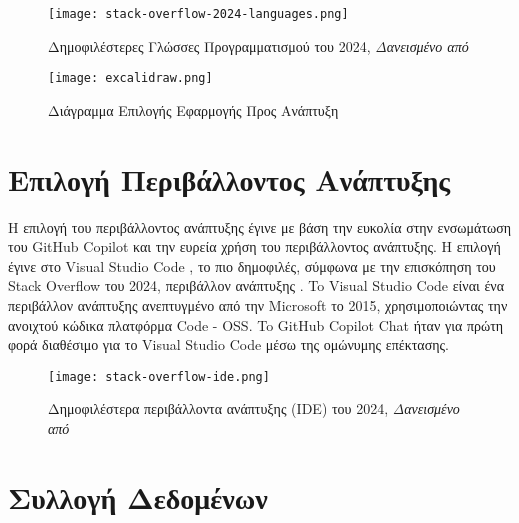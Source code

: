 \begin{figure}[H]
  \begin{center}
    \texttt{[image: stack-overflow-2024-languages.png]}
    \caption{Δημοφιλέστερες Γλώσσες Προγραμματισμού του 2024,
    \textit{Δανεισμένο από \cite{so2024}}}
  \end{center}
  \label{fig:SO2024LANGS}
\end{figure}

\begin{figure}[H]
  \begin{center}
    \texttt{[image: excalidraw.png]}
    \caption{Διάγραμμα Επιλογής Εφαρμογής Προς Ανάπτυξη}
  \end{center}
  \label{fig:excalidraw}
\end{figure}

\section{Επιλογή Περιβάλλοντος Ανάπτυξης }

Η επιλογή του περιβάλλοντος ανάπτυξης έγινε με βάση την ευκολία στην
ενσωμάτωση του \textlatin{GitHub Copilot} και την ευρεία χρήση του
περιβάλλοντος ανάπτυξης. Η επιλογή έγινε στο \textlatin{Visual Studio
Code} \cite{vscode}, το πιο δημοφιλές, σύμφωνα με την επισκόπηση του
\textlatin{Stack Overflow} του 2024, περιβάλλον ανάπτυξης
\cite{so2024}. To \textlatin{Visual Studio Code} είναι ένα περιβάλλον
ανάπτυξης ανεπτυγμένο από την \textlatin{Microsoft} το 2015,
χρησιμοποιώντας την ανοιχτού κώδικα πλατφόρμα \textlatin{Code - OSS}. To
\textlatin{GitHub Copilot Chat} ήταν για πρώτη φορά διαθέσιμο για το
\textlatin{Visual Studio Code} μέσω της ομώνυμης επέκτασης.
\cite{copilotchatrepo}

\begin{figure}[H]
  \begin{center}
    \texttt{[image: stack-overflow-ide.png]}
    \caption{Δημοφιλέστερα περιβάλλοντα ανάπτυξης (\textlatin{IDE}) του
    2024, \textit{Δανεισμένο από \cite{so2024}}}
  \end{center}
  \label{fig:SO2024IDES}
\end{figure}

\section{Συλλογή Δεδομένων}

